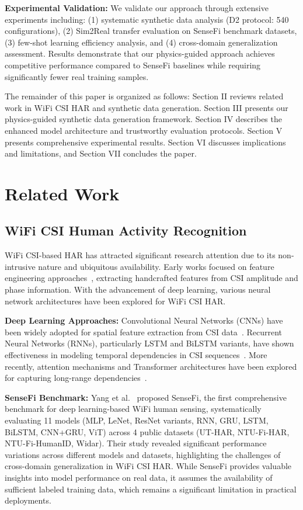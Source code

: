 \documentclass[journal]{IEEEtran}
\begin{document}
\textbf{Experimental Validation:} We validate our approach through extensive experiments including: (1) systematic synthetic data analysis (D2 protocol: 540 configurations), (2) Sim2Real transfer evaluation on SenseFi benchmark datasets, (3) few-shot learning efficiency analysis, and (4) cross-domain generalization assessment. Results demonstrate that our physics-guided approach achieves competitive performance compared to SenseFi baselines while requiring significantly fewer real training samples.

The remainder of this paper is organized as follows: Section II reviews related work in WiFi CSI HAR and synthetic data generation. Section III presents our physics-guided synthetic data generation framework. Section IV describes the enhanced model architecture and trustworthy evaluation protocols. Section V presents comprehensive experimental results. Section VI discusses implications and limitations, and Section VII concludes the paper.

\section{Related Work}

\subsection{WiFi CSI Human Activity Recognition}

WiFi CSI-based HAR has attracted significant research attention due to its non-intrusive nature and ubiquitous availability. Early works focused on feature engineering approaches~\cite{reference2}, extracting handcrafted features from CSI amplitude and phase information. With the advancement of deep learning, various neural network architectures have been explored for WiFi CSI HAR.

\textbf{Deep Learning Approaches:} Convolutional Neural Networks (CNNs) have been widely adopted for spatial feature extraction from CSI data~\cite{reference3}. Recurrent Neural Networks (RNNs), particularly LSTM and BiLSTM variants, have shown effectiveness in modeling temporal dependencies in CSI sequences~\cite{reference4}. More recently, attention mechanisms and Transformer architectures have been explored for capturing long-range dependencies~\cite{reference5}.

\textbf{SenseFi Benchmark:} Yang et al.~\cite{yang2023sensefi} proposed SenseFi, the first comprehensive benchmark for deep learning-based WiFi human sensing, systematically evaluating 11 models (MLP, LeNet, ResNet variants, RNN, GRU, LSTM, BiLSTM, CNN+GRU, ViT) across 4 public datasets (UT-HAR, NTU-Fi-HAR, NTU-Fi-HumanID, Widar). Their study revealed significant performance variations across different models and datasets, highlighting the challenges of cross-domain generalization in WiFi CSI HAR. While SenseFi provides valuable insights into model performance on real data, it assumes the availability of sufficient labeled training data, which remains a significant limitation in practical deployments.
\end{document}
